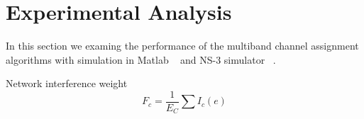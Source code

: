 \section{Experimental Analysis}
\label{sec:experiment_design}

In this section we examing the performance of the multiband channel assignment algorithms with simulation in Matlab ~\cite{matlab} and NS-3 simulator ~\cite{NS3}. 

Network interference weight
\begin{equation}
F_c=\frac{1}{E_C}\sum{I_c(e)}
\end{equation}










